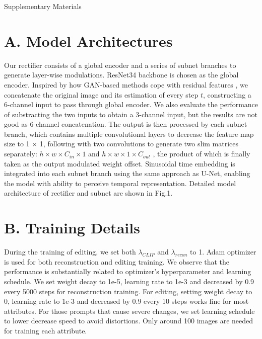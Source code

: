 \documentclass[letterpaper]{article} %
\begin{document}


\clearpage

\begin{huge}
Supplementary Materials
\end{huge}

\section{A. Model Architectures}

Our rectifier consists of a global encoder and a series of subnet branches to generate layer-wise modulations. ResNet34 \cite{he2016deep} backbone is chosen as the global encoder. Inspired by how GAN-based methods cope with residual features \cite{alaluf2022hyperstyle, pehlivan2023styleres, alaluf2021restyle}, we concatenate the original image and its estimation of every step $t$, constructing a 6-channel input to pass through global encoder. We also evaluate the performance of substracting the two inputs to obtain a 3-channel input, but the results are not good as 6-channel concatenation. The output is then processed by each subnet branch, which contains multiple convolutional layers to decrease the feature map size to 1 $\times$ 1, following with two convolutions to generate two slim matrices separately: $h \times w \times C_{in} \times 1$ and $h\times w\times 1\times C_{out}$ , the product of which is finally taken as the output modulated weight offset. Sinusoidal time embedding is integrated into each subnet branch using the same approach as U-Net, enabling the model with ability to perceive temporal representation. Detailed model architecture of rectifier and subnet are shown in Fig.1.

\section{B. Training Details}

During the training of editing, we set both $\lambda_{CLIP}$ and $\lambda_{recon}$ to 1. Adam optimizer is used for both reconstruction and editing training. We observe that the performance is substantially related to optimizer's hyperparameter and learning schedule. We set weight decay to 1e-5, learning rate to 1e-3 and decreased by 0.9 every 5000 steps for reconstruction training. For editing, setting weight decay to 0, learning rate to 1e-3 and decreased by 0.9 every 10 steps works fine for most attributes.
For those prompts that cause severe changes, we set learning schedule to lower decrease speed to avoid distortions. Only around 100 images are needed for training each attribute.
\end{document}
